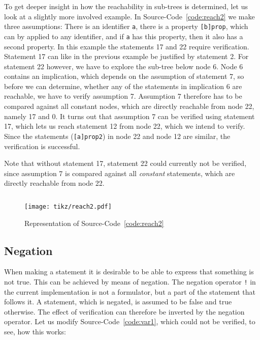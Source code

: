 \documentclass[british]{article}
\newcommand\prv{bc}
\newcommand\m[1]{\texttt{#1}}
\newenvironment{code}{\captionsetup{type=listing}}{}
\newcommand\scref[1]{Source-Code~\ref{code:#1}}
\begin{document}
To get deeper insight in how the reachability in sub-trees is determined, let us look at a slightly more involved example.
In \scref{reach2} we make three assumptions: There is an identifier \m{a}, there is a property \m{[b]prop}, which can by applied to any identifier, and if \m{a} has this property, then it also has a second property. In this example the statements 17 and 22 require verification. Statement 17 can like in the previous example be justified by statement 2. For statement 22 however, we have to explore the sub-tree below node 6. Node 6 contains an implication, which depends on the assumption of statement 7, so before we can determine, whether any of the statements in implication 6 are reachable, we have to verify assumption 7. Assumption 7 therefore has to be compared against all constant nodes, which are directly reachable from node 22, namely 17 and 0. It turns out that assumption 7 can be verified using statement 17, which lets us reach statement 12 from node 22, which we intend to verify. Since the statements (\m{[a]prop2}) in node 22 and node 12 are similar, the verification is successful.

Note that without statement 17, statement 22 could currently not be verified, since assumption 7 is compared against all \emph{constant} statements, which are directly reachable from node 22.
\pagebreak{}

\begin{code}
\label{code:reach2}
\inputminted[linenos]{\prv}{examples/reach2.prove}
\end{code}

\begin{figure}[!h]
\caption{Representation of \scref{reach2}}\label{fig:reach2}
\centering
\texttt{[image: tikz/reach2.pdf]}
\end{figure}

\pagebreak{}

\subsection{Negation}
When making a statement it is desirable to be able to express that something is not true. This can be achieved by means of negation. The negation operator \m{!} in the current implementation is not a formulator, but a part of the statement that follows it. A statement, which is negated, is assumed to be false and true otherwise. The effect of verification can therefore be inverted by the negation operator.
Let us modify \scref{var1}, which could not be verified, to see, how this works:
\end{document}
